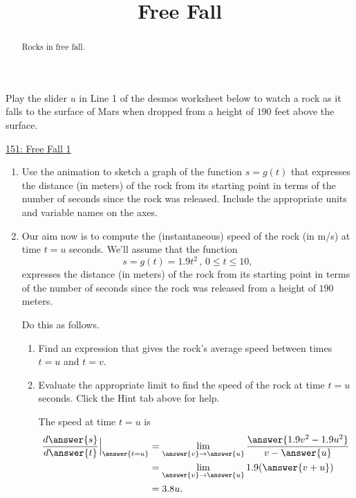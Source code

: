 \documentclass{ximera}
\title{Free Fall}
\begin{document}
\begin{abstract}
Rocks in free fall.
\end{abstract}
\maketitle



\begin{exploration}  \label{Qvbbtrg43444}

Play the slider $u$ in Line 1 of the desmos worksheet below to watch a rock as it falls to the surface of Mars when dropped from a height of $190$ feet above the surface.

\begin{onlineOnly}
    \begin{center}
\end{center}
\end{onlineOnly}

\href{https://www.desmos.com/calculator/gwhbaag99o}{151: Free Fall 1}

\begin{enumerate}
\item Use the animation to sketch a graph of the function $s=g(t)$ that expresses the distance (in meters) of the rock from its starting point in terms of the number of seconds since the rock was released. Include the appropriate units and variable names on the axes.

\item Our aim now is to compute the (instantaneous) speed of the rock (in m/s) at time $t=u$ seconds. We'll assume that the function 
\[
      s = g(t) = 1.9t^2 \, , \, 0\leq t \leq 10,
\] 
expresses the distance (in meters) of the rock from its starting point in terms of the number of seconds since the rock was released from a height of $190$ meters.

Do this as follows.  

\begin{enumerate}
\item Find an expression that gives the rock's average speed between times $t=u$ and $t=v$.

\item Evaluate the appropriate limit to find the speed of the rock at time $t=u$ seconds. Click the Hint tab above for help.

\begin{hint}

The speed at time $t=u$ is
\begin{align*}
    \frac{d\answer{s}}{d\answer{t}} \Big|_{\answer{t=u}} &=      \lim_{\answer{v}\to \answer{u}} \frac{\answer{1.9v^2-1.9u^2}}{v-\answer{u}}   \\
                                                       & = \lim_{\answer{v}\to \answer{u}} 1.9(\answer{v+u}) \\
                                                       & = 3.8u .
 \end{align*}
\end{hint}


\end{enumerate}
\end{enumerate}
\end{exploration}
\end{document}
